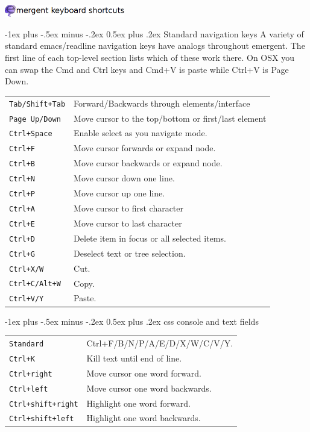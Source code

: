 \documentclass[10pt,landscape]{article}
\makeatletter
\renewcommand{\section}{\@startsection{section}{1}{0mm}%
                                {-1ex plus -.5ex minus -.2ex}%
                                {0.5ex plus .2ex}%
                                {\normalfont\large\bfseries}}
\makeatother
\begin{document}
\raggedright
\footnotesize
\begin{multicols}{3}
\vspace{-5mm}
\begin{center}\includegraphics[width=198.5px]{header.png}\end{center}
\setlength{\premulticols}{1pt}
\setlength{\postmulticols}{1pt}
\setlength{\multicolsep}{1pt}
\setlength{\columnsep}{2pt}
\section{Standard navigation keys}
A variety of standard emacs/readline navigation keys have analogs
throughout emergent. The first line of each top-level section lists
which of these work there. On OSX you can swap the Cmd and Ctrl keys
and Cmd+V is paste while Ctrl+V is Page Down. \\
\begin{tabular}{@{}ll@{}}
\verb!Tab/Shift+Tab! & Forward/Backwards through elements/interface \\
\verb!Page Up/Down!    & Move cursor to the top/bottom or first/last element\\
\verb!Ctrl+Space!    & Enable select as you navigate mode. \\
\verb!Ctrl+F!    & Move cursor forwards or expand node. \\
\verb!Ctrl+B!    & Move cursor backwards or expand node. \\
\verb!Ctrl+N!    & Move cursor down one line. \\
\verb!Ctrl+P!    & Move cursor up one line. \\
\verb!Ctrl+A!    & Move cursor to first character \\
\verb!Ctrl+E!    & Move cursor to last character \\
\verb!Ctrl+D!  & Delete item in focus or all selected items. \\
\verb!Ctrl+G!  & Deselect text or tree selection. \\
\verb!Ctrl+X/W! & Cut. \\
\verb!Ctrl+C/Alt+W! & Copy. \\
\verb!Ctrl+V/Y! & Paste.
\end{tabular}

\section{css console and text fields}
\begin{tabular}{@{}ll@{}}
\verb!Standard!  & Ctrl+F/B/N/P/A/E/D/X/W/C/V/Y. \\
\verb!Ctrl+K! & Kill text until end of line. \\
\verb!Ctrl+right! & Move cursor one word forward. \\
\verb!Ctrl+left! & Move cursor one word backwards. \\
\verb!Ctrl+shift+right! & Highlight one word forward. \\
\verb!Ctrl+shift+left! & Highlight one word backwards.
\end{tabular}


\end{multicols}
\end{document}
